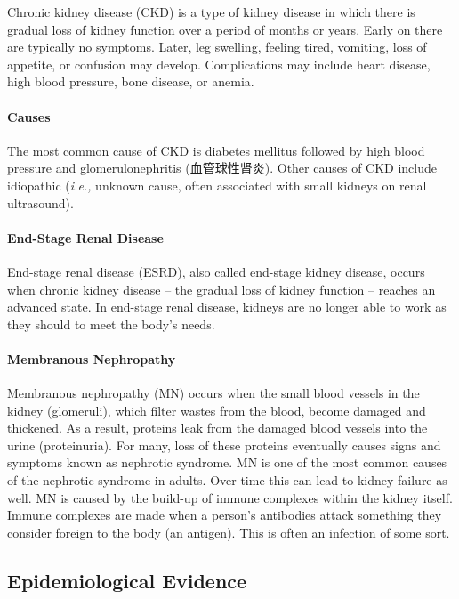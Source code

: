 \documentclass[11pt]{article}
\begin{document}
Chronic kidney disease (CKD) is a type of kidney disease in which there is gradual loss of kidney function over a period of months or years. Early on there are typically no symptoms. Later, leg swelling, feeling tired, vomiting, loss of appetite, or confusion may develop. Complications may include heart disease, high blood pressure, bone disease, or anemia.

\paragraph{Causes} The most common cause of CKD is diabetes mellitus followed by high blood pressure and glomerulonephritis (血管球性肾炎). Other causes of CKD include idiopathic (\textit{i.e.,} unknown cause, often associated with small kidneys on renal ultrasound). 

\paragraph{End-Stage Renal Disease} End-stage renal disease (ESRD), also called end-stage kidney disease, occurs when chronic kidney disease -- the gradual loss of kidney function -- reaches an advanced state. In end-stage renal disease, kidneys are no longer able to work as they should to meet the body's needs.

\paragraph{Membranous Nephropathy} Membranous nephropathy (MN) occurs when the small blood vessels in the kidney (glomeruli), which filter wastes from the blood, become damaged and thickened. As a result, proteins leak from the damaged blood vessels into the urine (proteinuria). For many, loss of these proteins eventually causes signs and symptoms known as nephrotic syndrome. MN is one of the most common causes of the nephrotic syndrome in adults. Over time this can lead to kidney failure as well. MN is caused by the build-up of immune complexes within the kidney itself. Immune complexes are made when a person's antibodies attack something they consider foreign to the body (an antigen). This is often an infection of some sort. 

\subsection{Epidemiological Evidence}
\end{document}
